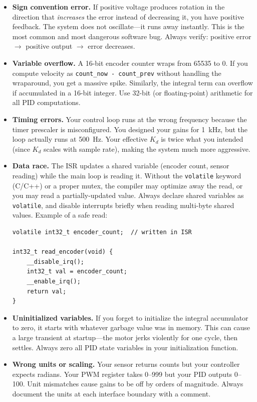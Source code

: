 \begin{itemize}
    \item \textbf{Sign convention error.} If positive voltage produces rotation in the direction that \textit{increases} the error instead of decreasing it, you have positive feedback. The system does not oscillate---it runs away instantly. This is the most common and most dangerous software bug. Always verify: positive error $\to$ positive output $\to$ error decreases.

    \item \textbf{Variable overflow.} A 16-bit encoder counter wraps from 65535 to 0. If you compute velocity as \texttt{count\_now - count\_prev} without handling the wraparound, you get a massive spike. Similarly, the integral term can overflow if accumulated in a 16-bit integer. Use 32-bit (or floating-point) arithmetic for all PID computations.

    \item \textbf{Timing errors.} Your control loop runs at the wrong frequency because the timer prescaler is misconfigured. You designed your gains for 1~kHz, but the loop actually runs at 500~Hz. Your effective $K_d$ is twice what you intended (since $K_d$ scales with sample rate), making the system much more aggressive.

    \item \textbf{Data race.} The ISR updates a shared variable (encoder count, sensor reading) while the main loop is reading it. Without the \texttt{volatile} keyword (C/C++) or a proper mutex, the compiler may optimize away the read, or you may read a partially-updated value. Always declare shared variables as \texttt{volatile}, and disable interrupts briefly when reading multi-byte shared values. Example of a safe read:

\begin{verbatim}
volatile int32_t encoder_count;  // written in ISR

int32_t read_encoder(void) {
    __disable_irq();
    int32_t val = encoder_count;
    __enable_irq();
    return val;
}
\end{verbatim}

    \item \textbf{Uninitialized variables.} If you forget to initialize the integral accumulator to zero, it starts with whatever garbage value was in memory. This can cause a large transient at startup---the motor jerks violently for one cycle, then settles. Always zero all PID state variables in your initialization function.

    \item \textbf{Wrong units or scaling.} Your sensor returns counts but your controller expects radians. Your PWM register takes 0--999 but your PID outputs 0--100. Unit mismatches cause gains to be off by orders of magnitude. Always document the units at each interface boundary with a comment.
\end{itemize}

